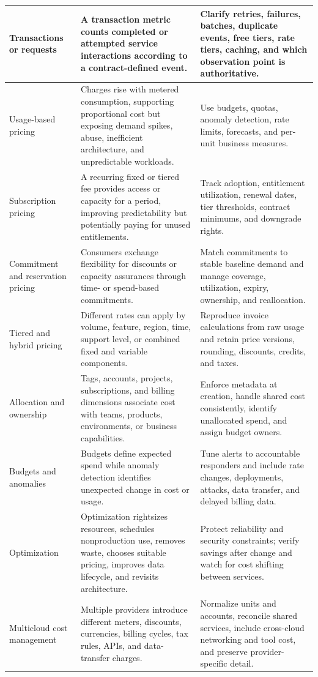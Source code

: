 \documentclass[11pt]{article}
\begin{document}
\begin{longtable}{@{}>{\RaggedRight\arraybackslash}p{}>{\RaggedRight\arraybackslash}p{}>{\RaggedRight\arraybackslash}p{}@{}}
Transactions or requests & A transaction metric counts completed or attempted service interactions according to a contract-defined event. & Clarify retries, failures, batches, duplicate events, free tiers, rate tiers, caching, and which observation point is authoritative. \\\midrule
Usage-based pricing & Charges rise with metered consumption, supporting proportional cost but exposing demand spikes, abuse, inefficient architecture, and unpredictable workloads. & Use budgets, quotas, anomaly detection, rate limits, forecasts, and per-unit business measures. \\\midrule
Subscription pricing & A recurring fixed or tiered fee provides access or capacity for a period, improving predictability but potentially paying for unused entitlements. & Track adoption, entitlement utilization, renewal dates, tier thresholds, contract minimums, and downgrade rights. \\\midrule
Commitment and reservation pricing & Consumers exchange flexibility for discounts or capacity assurances through time- or spend-based commitments. & Match commitments to stable baseline demand and manage coverage, utilization, expiry, ownership, and reallocation. \\\midrule
Tiered and hybrid pricing & Different rates can apply by volume, feature, region, time, support level, or combined fixed and variable components. & Reproduce invoice calculations from raw usage and retain price versions, rounding, discounts, credits, and taxes. \\\midrule
Allocation and ownership & Tags, accounts, projects, subscriptions, and billing dimensions associate cost with teams, products, environments, or business capabilities. & Enforce metadata at creation, handle shared cost consistently, identify unallocated spend, and assign budget owners. \\\midrule
Budgets and anomalies & Budgets define expected spend while anomaly detection identifies unexpected change in cost or usage. & Tune alerts to accountable responders and include rate changes, deployments, attacks, data transfer, and delayed billing data. \\\midrule
Optimization & Optimization rightsizes resources, schedules nonproduction use, removes waste, chooses suitable pricing, improves data lifecycle, and revisits architecture. & Protect reliability and security constraints; verify savings after change and watch for cost shifting between services. \\\midrule
Multicloud cost management & Multiple providers introduce different meters, discounts, currencies, billing cycles, tax rules, APIs, and data-transfer charges. & Normalize units and accounts, reconcile shared services, include cross-cloud networking and tool cost, and preserve provider-specific detail. \\\midrule
\bottomrule
\end{longtable}
\endgroup
\end{document}
